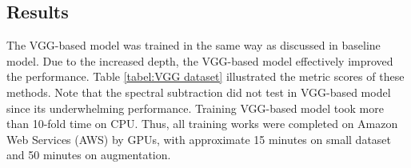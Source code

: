 \subsection{Results}
\begin{table}[htp]
\centering
\caption{Metrics score of Complex VGG-like model with three dataset strategies}
\label{tabel:VGG dataset}
\end{table}
The VGG-based model was trained in the same way as discussed in baseline model. Due to the increased depth, the VGG-based model effectively improved the performance. Table \ref{tabel:VGG dataset} illustrated the metric scores of these methods. Note that the spectral subtraction did not test in VGG-based model since its underwhelming performance. Training VGG-based model took more than 10-fold time on CPU. Thus, all training works were completed on Amazon Web Services (AWS) by GPUs, with approximate 15 minutes on small dataset and 50 minutes on augmentation. 

